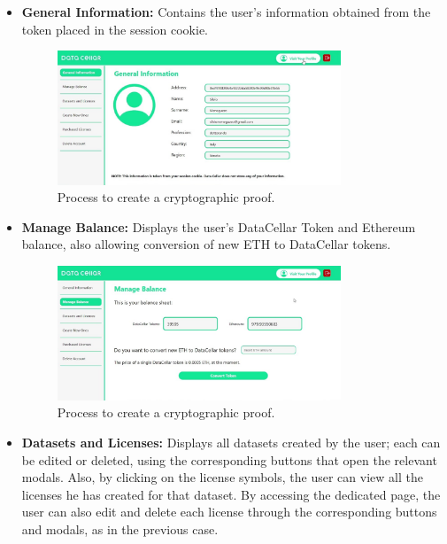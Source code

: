 \begin{itemize}
  \item \textbf{General Information:} Contains the user's information obtained from the token placed in the session cookie.
  
  \begin{figure}[h]  
    \centering
    \includegraphics[width=0.8\textwidth]{Images/c6_6.jpg} 
    \caption{Process to create a cryptographic proof.}
  \end{figure}
  
  \item \textbf{Manage Balance:} Displays the user's DataCellar Token and Ethereum balance, also allowing conversion of new ETH to DataCellar tokens.
  
  \begin{figure}[h]  
    \centering
    \includegraphics[width=0.8\textwidth]{Images/c6_7.jpg} 
    \caption{Process to create a cryptographic proof.}
  \end{figure}
  
  \item \textbf{Datasets and Licenses:} Displays all datasets created by the user; each can be edited or deleted, using the corresponding buttons that open the relevant 
  modals. Also, by clicking on the license symbols, the user can view all the licenses he has created for that dataset. By accessing the dedicated page, the user can also 
  edit and delete each license through the corresponding buttons and modals, as in the previous case. 
  

\end{itemize}
